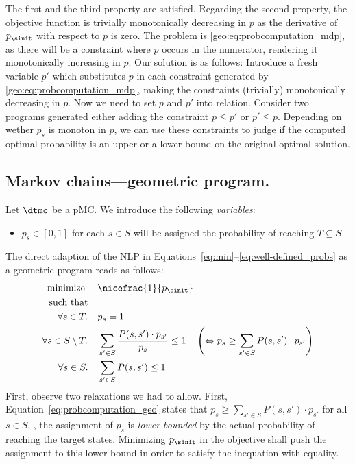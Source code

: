 The first and the third property are satisfied. Regarding the second property, the objective function is trivially monotonically decreasing in $p$ as the derivative of $p_{\sinit}$ with respect to $p$ is zero. The problem is \eqref{geo:eq:probcomputation_mdp}, as there will be a constraint where $p$ occurs in the numerator, rendering it monotonically increasing in $p$. Our solution is as follows: Introduce a fresh variable $p'$ which substitutes $p$ in each constraint generated by \eqref{geo:eq:probcomputation_mdp}, making the constraints (trivially) monotonically decreasing in $p$.
	Now we need to set $p$ and $p'$ into relation. Consider two programs generated either adding the constraint $p\leq p'$ or $p'\leq p$. Depending on wether $p_s$ is monoton in $p$, we can use these constraints to judge if the computed optimal probability is an upper or a lower bound on the original optimal solution. 

\subsection{Markov chains---geometric program.}
Let $\dtmc$ be a pMC. 
 We introduce the following \emph{variables}:
		\begin{itemize}
			\item $p_s\in[0,1]$ for each $s\in S$ will be assigned the probability of reaching $T\subseteq S$.
		\end{itemize}
	 	The direct adaption of the NLP in Equations~\ref{eq:min}--\ref{eq:well-defined_probs} as a geometric program reads as follows:
		\begin{align}
			\text{ minimize } &\quad \nicefrac{1}{p_{\sinit}}\\
			\text{such that}\\
			\forall s\in T.	 &\quad p_s=1\label{eq:targetprob_geo}\\
			\forall s\in S\setminus T.	&\quad  \sum_{s'\in S}	\frac{P(s,s')\cdot p_{s'}} {p_s} \leq 1\quad \left(\Leftrightarrow p_s \geq \sum_{s'\in S} P(s,s')\cdot p_{s'}\right) \label{eq:probcomputation_geo}\\
			\forall s\in S.	 &\quad \sum_{s'\in S}P(s,s')\leq 1\label{eq:well-defined_probs_geo}
		\end{align}
%
First, observe two relaxations we had to allow. First, Equation~\ref{eq:probcomputation_geo} states that $p_s \geq \sum_{s'\in S} P(s,s')\cdot p_{s'}$ for all $s\in S$, \ie, the assignment of $p_s$ is \emph{lower-bounded} by the actual probability of reaching the target states. Minimizing $p_{\sinit}$ in the objective shall push the assignment to this lower bound in order to satisfy the inequation with equality. 

